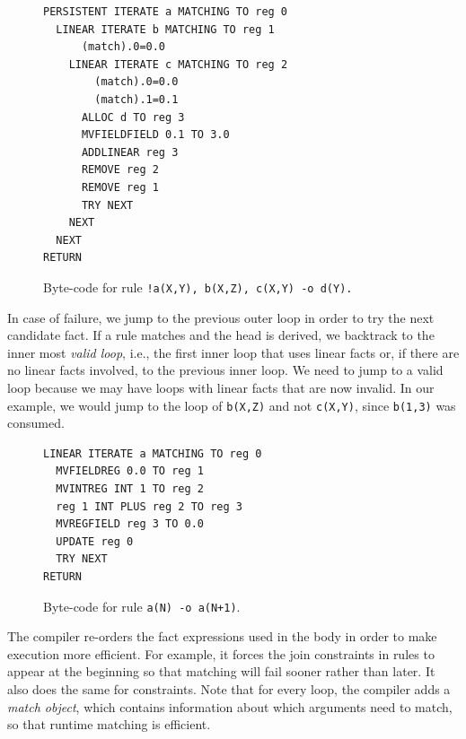 \begin{figure}
   \vspace{-1\intextsep}
\scriptsize\begin{Verbatim}
PERSISTENT ITERATE a MATCHING TO reg 0
  LINEAR ITERATE b MATCHING TO reg 1
      (match).0=0.0
    LINEAR ITERATE c MATCHING TO reg 2
        (match).0=0.0
        (match).1=0.1
      ALLOC d TO reg 3
      MVFIELDFIELD 0.1 TO 3.0
      ADDLINEAR reg 3
      REMOVE reg 2
      REMOVE reg 1
      TRY NEXT
    NEXT
  NEXT
RETURN
\end{Verbatim}
\caption{\small{Byte-code for rule \texttt{!a(X,Y), b(X,Z), c(X,Y) -o d(Y).}}}
\label{fig:byte_code}
\vspace{-1\intextsep}
\end{figure}

In case of failure, we jump to the previous outer loop in order to try the next candidate fact.
If a rule matches and the head is derived, we backtrack to the inner most \emph{valid loop}, i.e.,
the first inner loop that uses linear facts or, if there are no linear facts involved, to the previous 
inner loop. We need to jump to a valid loop because we may have loops with linear facts that are now invalid.
In our example, we would jump to the
loop of \texttt{b(X,Z)} and not \texttt{c(X,Y)}, since \texttt{b(1,3)} was consumed.


\begin{figure}
\vspace{-1\intextsep}
\scriptsize\begin{Verbatim}
LINEAR ITERATE a MATCHING TO reg 0
  MVFIELDREG 0.0 TO reg 1
  MVINTREG INT 1 TO reg 2
  reg 1 INT PLUS reg 2 TO reg 3
  MVREGFIELD reg 3 TO 0.0
  UPDATE reg 0
  TRY NEXT
RETURN
\end{Verbatim}
\vspace{-0.5\intextsep}
\caption{\small{Byte-code for rule \texttt{a(N) -o a(N+1)}.}}
\label{code:update}
\vspace{-1\intextsep}
\end{figure}

The compiler re-orders the fact expressions used in the body in order to make execution more
efficient. For example, it forces the join constraints in rules to appear at the beginning so
that matching will fail sooner rather than later. It also does the same for constraints.
Note that for every loop, the compiler adds a \emph{match object}, which contains information
about which arguments need to match, so that runtime matching is efficient.


